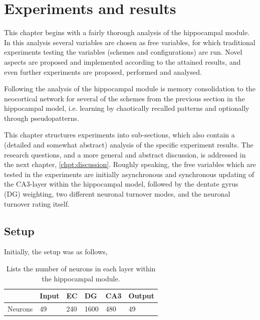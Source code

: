 
\chapter{Experiments and results}\label{chpt:experiments}

This chapter begins with a fairly thorough analysis of the hippocampal module. In this analysis several variables are chosen as free variables, for which traditional experiments testing the variables (schemes and configurations) are run. Novel aspects are proposed and implemented according to the attained results, and even further experiments are proposed, performed and analysed.

Following the analysis of the hippocampal module is memory consolidation to the neocortical network for several of the schemes from the previous section in the hippocampal model, i.e. learning by chaotically recalled patterns and optionally through pseudopatterns.

This chapter structures experiments into sub-sections, which also contain a (detailed and somewhat abstract) analysis of the specific experiment results. The research questions, and a more general and abstract discussion, is addressed in the next chapter, \ref{chpt:discussion}.
Roughly speaking, the free variables which are tested in the experiments are initially asynchronous and synchronous updating of the CA3-layer within the hippocampal model, followed by the dentate gyrus (DG) weighting, two different neuronal turnover modes, and the neuronal turnover rating itself.


\section{Setup}

Initially, the setup was as follows,

\begin{table}
\centering
\caption{Lists the number of neurons in each layer within the hippocampal module.}
\label{table:number_of_neurons}
\begin{tabular}{l|l|l|l|l|l|}
\cline{2-6}
                              & Input & EC  & DG   & CA3 & Output \\ \hline
\multicolumn{1}{|l|}{Neurons} & 49    & 240 & 1600 & 480 & 49     \\ \hline
\end{tabular}
\end{table}

